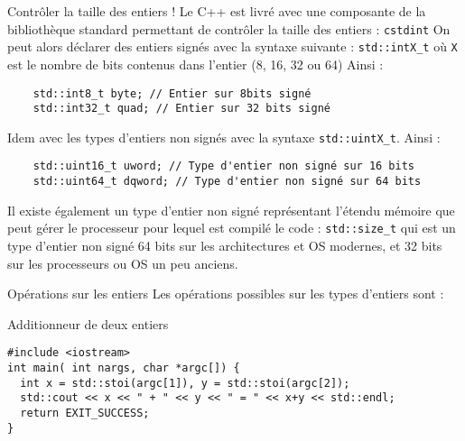\documentclass[compress,10pt,aspectratio=169]{beamer}
\begin{document}
\begin{frame}[fragile]{Contrôler la taille des entiers !}
    \scriptsize
    Le C++ est livré avec une composante de la bibliothèque standard permettant de contrôler la taille des entiers : \texttt{cstdint}
    On peut alors déclarer des entiers signés avec la syntaxe suivante : \texttt{std::intX_t} où \texttt{X} est le nombre de bits contenus dans l'entier (8, 16, 32 ou 64)
    Ainsi :
    \begin{verbatim}
    std::int8_t byte; // Entier sur 8bits signé 
    std::int32_t quad; // Entier sur 32 bits signé
    \end{verbatim}
    Idem avec les types d'entiers non signés avec la syntaxe \texttt{std::uintX\_t}. Ainsi :
    \begin{verbatim}
    std::uint16_t uword; // Type d'entier non signé sur 16 bits 
    std::uint64_t dqword; // Type d'entier non signé sur 64 bits
    \end{verbatim}

    Il existe également un type d'entier non signé représentant l'étendu mémoire que peut gérer le processeur pour lequel est compilé le code : \texttt{std::size\_t}
    qui est un type d'entier non signé 64 bits sur les architectures et OS modernes, et 32 bits sur les processeurs ou OS un peu anciens. 
\end{frame}

\begin{frame}[fragile]{Opérations sur les entiers}
\scriptsize
Les opérations possibles sur les types d'entiers sont :
\vspace*{-2mm}
\begin{exampleblock}{\scriptsize Additionneur de deux entiers}
\begin{verbatim}
#include <iostream>
int main( int nargs, char *argc[]) {
  int x = std::stoi(argc[1]), y = std::stoi(argc[2]);
  std::cout << x << " + " << y << " = " << x+y << std::endl;
  return EXIT_SUCCESS;
}
\end{verbatim}
\end{exampleblock}   
\end{frame}
\end{document}
